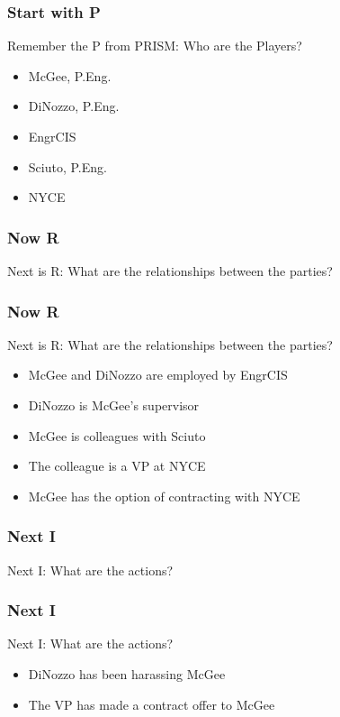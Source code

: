 \begin{frame}
\frametitle{Start with P}

Remember the P from PRISM: Who are the Players?

\begin{itemize}
	\item McGee, P.Eng.
	\item DiNozzo, P.Eng.
	\item EngrCIS
	\item Sciuto, P.Eng.
	\item NYCE
\end{itemize}


\end{frame}



\begin{frame}
\frametitle{Now R}

Next is R:  What are the relationships between the parties? 


\end{frame}

\begin{frame}
\frametitle{Now R}

Next is R:  What are the relationships between the parties? 

\begin{itemize}
	\item McGee  and DiNozzo are employed by EngrCIS
	\item DiNozzo is McGee's supervisor 
	\item McGee is colleagues with Sciuto
	\item The colleague is a VP at NYCE
	\item McGee has the option of contracting with NYCE
\end{itemize}


\end{frame}

\begin{frame}
\frametitle{Next I}

Next I: What are the actions?


\end{frame}

\begin{frame}
\frametitle{Next I}

Next I: What are the actions?

\begin{itemize}
	\item DiNozzo has been harassing McGee
	\item The VP has made a contract offer to McGee
\end{itemize}

\end{frame}



